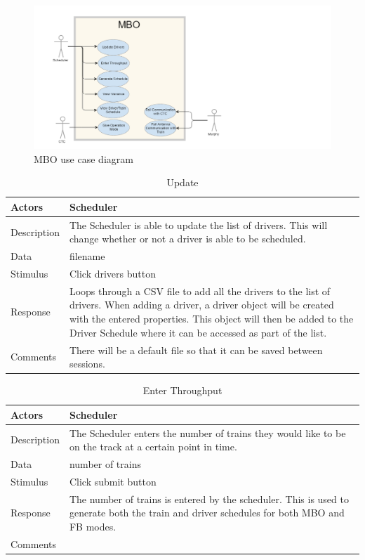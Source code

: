 \documentclass[]{article}
\begin{document}
\begin{figure}[H]
	\centering
	\includegraphics[scale=.5]{mbousecase.png}
	\caption{MBO use case diagram}
\end{figure}
\begin{table}[H]
	\centering
	\caption{Update}
	\begin{tabular}{|l|l|}
		\hline
		Actors & \parbox[t]{10cm}{Scheduler} \\ \hline
		Description & \parbox[t]{10cm}{The Scheduler is able to update the list of drivers. This will change whether or not a driver is able to be scheduled.} \\ \hline
		Data &  \parbox[t]{10cm}{filename} \\ \hline
		Stimulus &  \parbox[t]{10cm}{Click drivers button} \\ \hline
		Response & \parbox[t]{10cm}{Loops through a CSV file to add all the drivers to the list of drivers. When adding a driver, a driver object will be created with the entered properties. This object will then be added to the Driver Schedule where it can be accessed as part of the list.}\\ \hline
		Comments & \parbox[t]{10cm}{There will be a default file so that it can be saved between sessions.}  \\ \hline
	\end{tabular}
\end{table}

\begin{table}[H]
	\centering
	\caption{Enter Throughput}
	\begin{tabular}{|l|l|}
		\hline
		Actors & \parbox[t]{10cm}{Scheduler} \\ \hline
		Description & \parbox[t]{10cm}{The Scheduler enters the number of trains they would like to be on the track at a certain point in time.} \\ \hline
		Data &  \parbox[t]{10cm}{number of trains} \\ \hline
		Stimulus &  \parbox[t]{10cm}{Click submit button} \\ \hline
		Response & \parbox[t]{10cm}{The number of trains is entered by the scheduler. This is used to generate both the train and driver schedules for both MBO and FB modes.}\\ \hline
		Comments & \parbox[t]{10cm}{}  \\ \hline
	\end{tabular}
\end{table}
\end{document}
